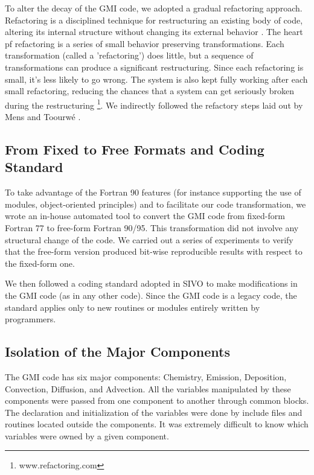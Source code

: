 \documentclass[11pt]{article}
\begin{document}
To alter the decay of the GMI code, we adopted a gradual refactoring approach.
Refactoring is a disciplined technique for restructuring an existing body
of code, altering its internal structure without changing its external behavior
\cite{Fowler99}. 
The heart pf refactoring is a series of small behavior preserving transformations. 
Each transformation (called a 'refactoring') does little, but a sequence of 
transformations can produce a significant restructuring. 
Since each refactoring is small, it's less likely to go wrong. 
The system is also kept fully working after each small refactoring, 
reducing the chances that a system can get seriously broken during the
restructuring \footnote{www.refactoring.com}.
We indirectly followed the refactory steps laid out by Mens and Toourw\'e 
\cite{Mens-Tourwe04}.


\subsection{From Fixed to Free Formats and Coding Standard}
To take advantage of the Fortran 90 features (for instance supporting 
the use of modules, object-oriented principles) and to facilitate our code 
transformation, we wrote an in-house
automated tool to convert the GMI code from fixed-form Fortran 77 to 
free-form Fortran 90/95.
This transformation did not involve any structural change of the code.
We carried out a series of experiments to verify that the free-form version produced
bit-wise reproducible results with respect to the fixed-form one.

We then followed a coding standard adopted in SIVO to make modifications
in the GMI code (as in any other code). Since the GMI code is a legacy code, the
standard applies only to new routines or modules entirely written by programmers.
%
%
%
\subsection{Isolation of the Major Components}
%
The GMI code has six major components: Chemistry, Emission, Deposition,
Convection, Diffusion, and Advection.
All the variables manipulated by these components were passed from one component
to another through common blocks. The declaration and initialization of the variables
were done by include files and routines located outside the components.
It was extremely difficult to know which variables were owned by a given component.
\end{document}

